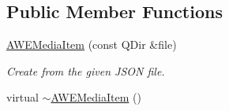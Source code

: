 \subsection*{Public Member Functions}
\begin{DoxyCompactItemize}
\item 
\hyperlink{class_a_w_e_media_item_aa3e6fb6c882e38f5c636de2b0630571e}{A\-W\-E\-Media\-Item} (const Q\-Dir \&file)
\begin{DoxyCompactList}\small\item\em Create from the given J\-S\-O\-N file. \end{DoxyCompactList}\item 
\hypertarget{class_a_w_e_media_item_ad1de3d9410895ebb23d2d1bf80403a16}{virtual \hyperlink{class_a_w_e_media_item_ad1de3d9410895ebb23d2d1bf80403a16}{$\sim$\-A\-W\-E\-Media\-Item} ()}\label{class_a_w_e_media_item_ad1de3d9410895ebb23d2d1bf80403a16}


\end{DoxyCompactItemize}

